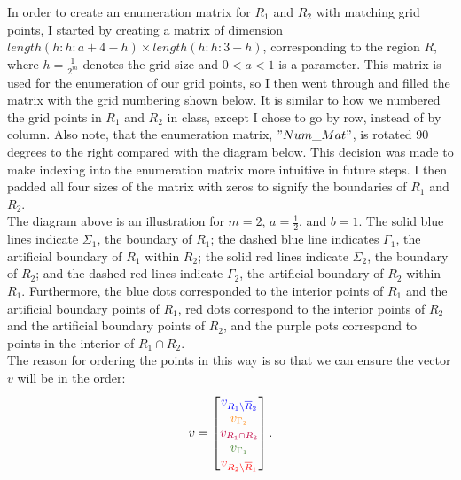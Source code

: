 \documentclass[12pt]{article}
\begin{document}
In order to create an enumeration matrix for $R_1$ and $R_2$ with matching grid points, I started by creating a matrix of dimension $length(h:h:a+4-h)\times length(h:h:3-h)$, corresponding to the region $R$, where $h = \frac{1}{2^m}$ denotes the grid size and $0 < a < 1$ is a parameter.  This matrix is used for the enumeration of our grid points, so I then went through and filled the matrix with the grid numbering shown below.  It is similar to how we numbered the grid points in $R_1$ and $R_2$ in class, except I chose to go by row, instead of by column.  Also note, that the enumeration matrix, $"Num\_Mat"$, is rotated 90 degrees to the right compared with the diagram below.  This decision was made to make indexing into the enumeration matrix more intuitive in future steps.  I then padded all four sizes of the matrix with zeros to signify the boundaries of $R_1$ and $R_2$.\\

\noindent
The diagram above is an illustration for $m = 2$, $a = \frac{1}{2}$, and $b = 1$.  The solid blue lines indicate {\color{blue}$\Sigma_1$}, the boundary of {\color{blue}$R_1$}; the dashed blue line indicates {\color{OliveGreen}$\Gamma_1$}, the artificial boundary of {\color{blue}$R_1$} within {\color{red}$R_2$}; the solid red lines indicate {\color{red}$\Sigma_2$}, the boundary of {\color{red}$R_2$}; and the dashed red lines indicate {\color{orange}$\Gamma_2$}, the artificial boundary of {\color{red}$R_2$} within {\color{blue}$R_1$}.  Furthermore, the blue dots corresponded to the interior points of {\color{blue}$R_1$} and the artificial boundary points of {\color{blue}$R_1$}, red dots correspond to the interior points of {\color{red}$R_2$} and the artificial boundary points of {\color{red}$R_2$}, and the purple pots correspond to points in the interior of {\color{purple}$R_1 \cap R_2$}.\\

\noindent
The reason for ordering the points in this way is so that we can ensure the vector $v$ will be in the order:
$$v = \begin{bmatrix}
{\color{blue}v_{R_1\backslash \overline{R}_2}} \\
{\color{orange}v_{\Gamma_2}} \\
{\color{purple}v_{R_1 \cap R_2}} \\
{\color{OliveGreen}v_{\Gamma_1}} \\
{\color{red}v_{R_2\backslash \overline{R}_1}} \\
\end{bmatrix}.$$
\end{document}
